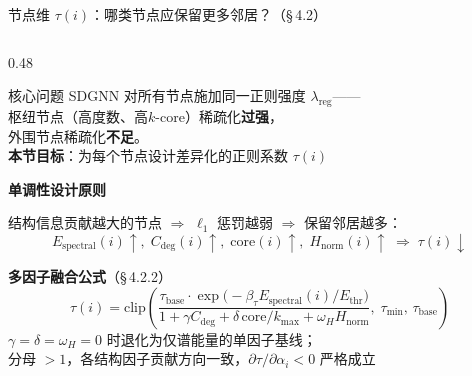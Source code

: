 \documentclass[aspectratio=169,9pt,xcolor=dvipsnames]{beamer}
\newcommand{\blue}[1]{\textcolor{mynavy}{#1}}
\begin{document}
\begin{frame}{节点维 $\tau(i)$：哪类节点应保留更多邻居？（§\,4.2）}
\begin{columns}[T]

\begin{column}{0.48\textwidth}
  \begin{alertblock}{核心问题}
    SDGNN 对所有节点施加同一正则强度 $\lambda_{\mathrm{reg}}$——\\
    枢纽节点（高度数、高$k$-core）稀疏化\textbf{过强}，\\
    外围节点稀疏化\textbf{不足}。\\[3pt]
    \textbf{本节目标}：为每个节点设计差异化的正则系数 $\tau(i)$
  \end{alertblock}

  \vspace{0.15cm}
  \textbf{\blue{单调性设计原则}}

  结构信息贡献越大的节点 $\Rightarrow$ $\ell_1$ 惩罚越弱 $\Rightarrow$ 保留邻居越多：
  \begin{equation*}
    E_{\mathrm{spectral}}(i)\uparrow,\;
    C_{\mathrm{deg}}(i)\uparrow,\;
    \mathrm{core}(i)\uparrow,\;
    H_{\mathrm{norm}}(i)\uparrow
    \;\Rightarrow\;\tau(i)\downarrow
  \end{equation*}

  \vspace{0.1cm}
  \textbf{\blue{多因子融合公式}}（§\,4.2.2）
     {\small
     \begin{equation*}
      \tau(i)=\mathrm{clip}\!\!\left(
      \frac{\tau_{\mathrm{base}}\cdot
      \exp\!\bigl(-\beta_\tau E_{\mathrm{spectral}}(i)/E_{\mathrm{thr}}\bigr)}
      {1+\gamma C_{\mathrm{deg}}+\delta\,\mathrm{core}/k_{\max}+\omega_H H_{\mathrm{norm}}},\;
      \tau_{\min},\,\tau_{\mathrm{base}}\right)
    \end{equation*}
    $\gamma=\delta=\omega_H=0$ 时退化为仅谱能量的单因子基线；\\
    分母 $>1$，各结构因子贡献方向一致，$\partial\tau/\partial\alpha_i<0$ 严格成立
     }

\end{column}


\end{columns}
\end{frame}
\end{document}
